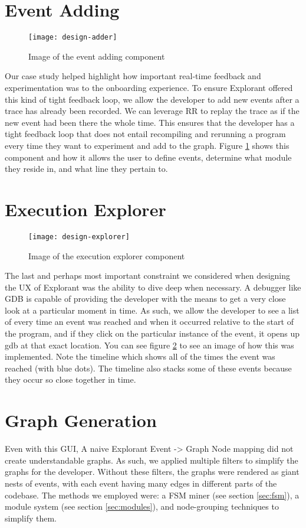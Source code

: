 \section{Event Adding}
\begin{figure}[!ht]
    \centering
    \texttt{[image: design-adder]}
    \caption{Image of the event adding component}
    \label{fig:graph-add}
\end{figure}
Our case study helped highlight how important real-time feedback and experimentation was to the onboarding experience. To ensure Explorant offered this kind of tight feedback loop, we allow the developer to add new events after a trace has already been recorded. We can leverage RR to replay the trace as if the new event had been there the whole time. This ensures that the developer has a tight feedback loop that does not entail recompiling and rerunning a program every time they want to experiment and add to the graph. Figure \ref{fig:graph-add} shows this component and how it allows the user to define events, determine what module they reside in, and what line they pertain to.  

\section{Execution Explorer}
\label{sec:exec-explorer}
\begin{figure}[!ht]
    \centering
    \texttt{[image: design-explorer]}
    \caption{Image of the execution explorer component}
    \label{fig:graph-exp}
\end{figure}
The last and perhaps most important constraint we considered when designing the UX of Explorant was the ability to dive deep when necessary. A debugger like GDB is capable of providing the developer with the means to get a very close look at a particular moment in time. As such, we allow the developer to see a list of every time an event was reached and when it occurred relative to the start of the program, and if they click on the particular instance of the event, it opens up gdb at that exact location. You can see figure \ref{fig:graph-exp} to see an image of how this was implemented. Note the timeline which shows all of the times the event was reached (with blue dots). The timeline also stacks some of these events because they occur so close together in time. 

\section{Graph Generation}
\label{sec:simplification}
Even with this GUI, A naive Explorant Event -> Graph Node mapping did not create understandable graphs. As such, we applied multiple filters to simplify the graphs for the developer. Without these filters, the graphs were rendered as giant nests of events, with each event having many edges in different parts of the codebase. The methods we employed were: a FSM miner (see section \ref{sec:fsm}), a module system (see section \ref{sec:modules}), and node-grouping techniques to simplify them.

